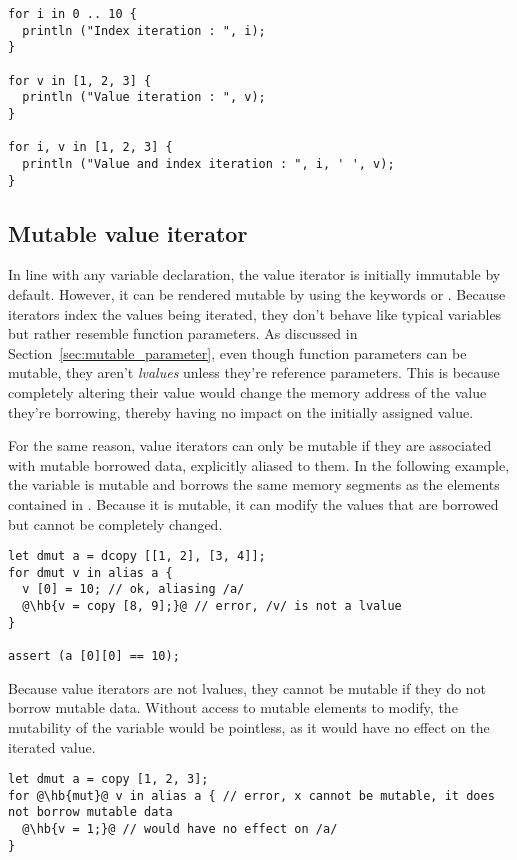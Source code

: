 \begin{lstlisting}[style=coloredverbatim, escapechar=@]
for i in 0 .. 10 {
  println ("Index iteration : ", i);
}

for v in [1, 2, 3] {
  println ("Value iteration : ", v);
}

for i, v in [1, 2, 3] {
  println ("Value and index iteration : ", i, ' ', v);
}
\end{lstlisting}

\subsection {Mutable value iterator}

In line with any variable declaration, the value iterator is initially immutable
by default. However, it can be rendered mutable by using the keywords
 or . Because iterators index the values being iterated,
they don't behave like typical variables but rather resemble function
parameters. As discussed in Section~\ref{sec:mutable_parameter}, even though
function parameters can be mutable, they aren't \textit{lvalues} unless they're
reference parameters. This is because completely altering their value would
change the memory address of the value they're borrowing, thereby having no
impact on the initially assigned value.

For the same reason, value iterators can only be mutable if they are associated
with mutable borrowed data, explicitly aliased to them. In the following
example, the variable  is mutable and borrows the same memory segments
as the elements contained in . Because it is mutable, it can modify
the values that are borrowed but cannot be completely changed.

\begin{lstlisting}[style=coloredverbatim, escapechar=@]
let dmut a = dcopy [[1, 2], [3, 4]];
for dmut v in alias a {
  v [0] = 10; // ok, aliasing /a/
  @\hb{v = copy [8, 9];}@ // error, /v/ is not a lvalue
}

assert (a [0][0] == 10);
\end{lstlisting}

Because value iterators are not lvalues, they cannot be mutable if they do not
borrow mutable data. Without access to mutable elements to modify, the
mutability of the variable would be pointless, as it would have no effect on the
iterated value.

\begin{lstlisting}[style=coloredverbatim, escapechar=@, caption=Useless mutable iterator, label=lst:useless_mut_iterator]
let dmut a = copy [1, 2, 3];
for @\hb{mut}@ v in alias a { // error, x cannot be mutable, it does not borrow mutable data
  @\hb{v = 1;}@ // would have no effect on /a/
}
\end{lstlisting}

